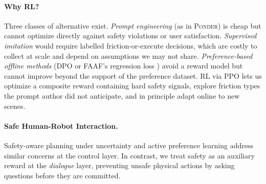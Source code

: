 \paragraph{Why RL?}
Three classes of alternative exist. \emph{Prompt engineering} (as in \textsc{Ponder}) is cheap but cannot optimize directly against safety violations or user satisfaction. \emph{Supervised imitation} \cite{ross2011dagger} would require labelled friction-or-execute decisions, which are costly to collect at scale and depend on assumptions we may not share. \emph{Preference-based offline methods} (DPO \cite{rafailov2023dpo} or FAAF's regression loss \cite{nath2025faaf}) avoid a reward model but cannot improve beyond the support of the preference dataset. RL via PPO lets us optimize a composite reward containing hard safety signals, explore friction types the prompt author did not anticipate, and in principle adapt online to new scenes.

\paragraph{Safe Human-Robot Interaction.}
Safety-aware planning under uncertainty \cite{lasota2017safe,hu2024shielding} and active preference learning \cite{sadigh2017active,biyik2024active} address similar concerns at the control layer. In contrast, we treat safety as an auxiliary reward at the \emph{dialogue} layer, preventing unsafe physical actions by asking questions before they are committed.
